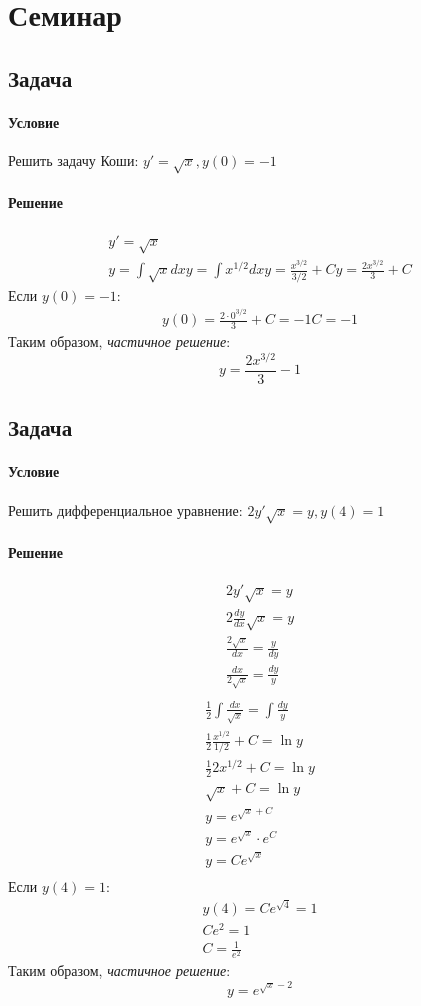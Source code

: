 \section{Семинар}

\subsection{Задача }
\paragraph{Условие}
Решить задачу Коши: $y' = \sqrt{x}, y(0) = -1$
\paragraph{Решение}
\begin{gather*}
	y' = \sqrt{x} \\
	y = \int \sqrt{x}dx
	y = \int x^{1/2}dx
	y = \frac{x^{3/2}}{3/2} + C
	y = \frac{2x^{3/2}}{3} + C
\end{gather*}
Если $y(0) = -1$:
\begin{gather*}
	y(0) = \frac{2 \cdot 0^{3/2}}{3} + C = -1
	C = -1
\end{gather*}
Таким образом, \textit{частичное решение}:
\[y = \frac{2x^{3/2}}{3} - 1\]

\subsection{Задача }
\paragraph{Условие}
Решить дифференциальное уравнение: $2y'\sqrt{x} = y, y(4) = 1$
\paragraph{Решение}
\begin{gather*}
	2y'\sqrt{x} = y \\
	2 \frac{dy}{dx} \sqrt{x} = y \\
	\frac{2\sqrt{x}}{dx} = \frac{y}{dy} \\
	\frac{dx}{2\sqrt{x}} = \frac{dy}{y} \\
\end{gather*}
\begin{gather*}
	\frac{1}{2} \int \frac{dx}{\sqrt{x}} = \int \frac{dy}{y} \\
	\frac{1}{2} \frac{x^{1/2}}{1/2} + C = \ln{y} \\
	\frac{1}{2} 2x^{1/2} + C = \ln{y} \\
	\sqrt{x} + C = \ln{y} \\
	y = e^{\sqrt{x} + C} \\
	y = e^{\sqrt{x}} \cdot e^C \\
	y = Ce^{\sqrt{x}} \\
\end{gather*}
Если $y(4) = 1$:
\begin{gather*}
	y(4) = Ce^{\sqrt{4}} = 1 \\
	Ce^2 = 1 \\
	C = \frac{1}{e^2}
\end{gather*}
Таким образом, \textit{частичное решение}:
\[y = e^{\sqrt{x} - 2}\]
